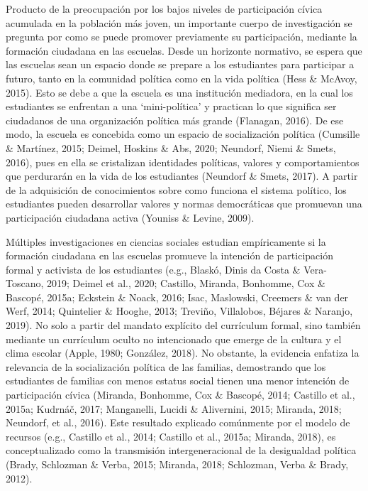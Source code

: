 \documentclass[12pt,twoside]{templates/facsothesis}
\begin{document}
Producto de la preocupación por los bajos niveles de participación cívica acumulada en la población más joven, un importante cuerpo de investigación se pregunta por como se puede promover previamente su participación, mediante la formación ciudadana en las escuelas. Desde un horizonte normativo, se espera que las escuelas sean un espacio donde se prepare a los estudiantes para participar a futuro, tanto en la comunidad política como en la vida política (Hess \& McAvoy, 2015). Esto se debe a que la escuela es una institución mediadora, en la cual los estudiantes se enfrentan a una `mini-política' y practican lo que significa ser ciudadanos de una organización política más grande (Flanagan, 2016). De ese modo, la escuela es concebida como un espacio de socialización política (Cumsille \& Martínez, 2015; Deimel, Hoskins \& Abs, 2020; Neundorf, Niemi \& Smets, 2016), pues en ella se cristalizan identidades políticas, valores y comportamientos que perdurarán en la vida de los estudiantes (Neundorf \& Smets, 2017). A partir de la adquisición de conocimientos sobre como funciona el sistema político, los estudiantes pueden desarrollar valores y normas democráticas que promuevan una participación ciudadana activa (Youniss \& Levine, 2009).

Múltiples investigaciones en ciencias sociales estudian empíricamente si la formación ciudadana en las escuelas promueve la intención de participación formal y activista de los estudiantes (e.g., Blaskó, Dinis da Costa \& Vera-Toscano, 2019; Deimel et al., 2020; Castillo, Miranda, Bonhomme, Cox \& Bascopé, 2015a; Eckstein \& Noack, 2016; Isac, Maslowski, Creemers \& van der Werf, 2014; Quintelier \& Hooghe, 2013; Treviño, Villalobos, Béjares \& Naranjo, 2019). No solo a partir del mandato explícito del currículum formal, sino también mediante un currículum oculto no intencionado que emerge de la cultura y el clima escolar (Apple, 1980; González, 2018). No obstante, la evidencia enfatiza la relevancia de la socialización política de las familias, demostrando que los estudiantes de familias con menos estatus social tienen una menor intención de participación cívica (Miranda, Bonhomme, Cox \& Bascopé, 2014; Castillo et al., 2015a; Kudrnáč, 2017; Manganelli, Lucidi \& Alivernini, 2015; Miranda, 2018; Neundorf, et al., 2016). Este resultado explicado comúnmente por el modelo de recursos (e.g., Castillo et al., 2014; Castillo et al., 2015a; Miranda, 2018), es conceptualizado como la transmisión intergeneracional de la desigualdad política (Brady, Schlozman \& Verba, 2015; Miranda, 2018; Schlozman, Verba \& Brady, 2012).
\end{document}
